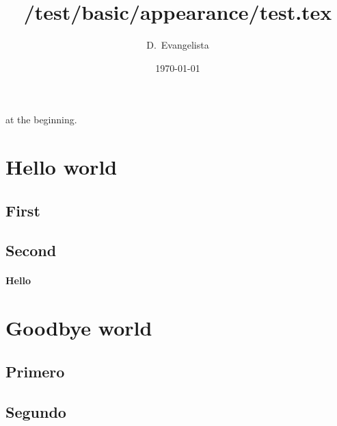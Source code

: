 \documentclass{article}
\title{/test/basic/appearance/test.tex}
\author{D.~Evangelista}
\date{\today}
\begin{document}
\maketitle

 at the beginning. %

\section{Hello world}
\lipsum[1][1]

\subsection{First}
\lipsum[1][2]

\subsection{Second}
\lipsum[1][3]

\paragraph{Hello} \lipsum[1][4]

\section{Goodbye world}
\lipsum[2][1]

\subsection{Primero}
\lipsum[2][2]

\subsection{Segundo}
\lipsum[2][3]

\begin{fullwidth}
\small\itshape\lipsum[1]
\end{fullwidth}
\end{document}
